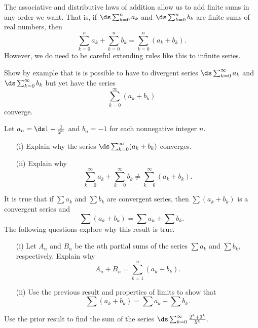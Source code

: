 \begin{exercises}
\begin{exerciseSolution}
\end{exerciseSolution}

\ea	

\item The associative and distributive laws of addition allow us to add finite sums in any order we want. That is, if $\ds \sum_{k=0}^n a_k$ and $\ds \sum_{k=0}^n b_k$ are finite sums of real numbers, then
\[\sum_{k=0}^{n} a_k + \sum_{k=0}^n b_k = \sum_{k=0}^n (a_k+b_k).\]
However, we do need to be careful extending rules like this to infinite series.
\ba
\item Show by example that is is possible to have to divergent series $\ds \sum_{k=0}^{\infty} a_k$ and $\ds \sum_{k=0}^{\infty} b_k$ but yet have the series
\[ \sum_{k=0}^{\infty} (a_k+b_k)\]
converge.

\item Let $a_n = \ds 1 + \frac{1}{2^n}$ and $b_n = -1$ for each nonnegative integer $n$.
    \begin{itemize}
    \item[(i)] Explain why the series $\ds \sum_{k=0}^{\infty} (a_k+b_k)$ converges.

    \item[(ii)] Explain why
\[\sum_{k=0}^{\infty} a_k + \sum_{k=0}^{\infty} b_k \neq \sum_{k=0}^{\infty} (a_k+b_k).\]

    \end{itemize}

\item It is true that if $\sum a_k$ and $\sum b_k$ are convergent series, then $\sum (a_k+b_k)$ is a convergent series and
\[\sum (a_k+b_k) = \sum a_k + \sum b_k.\]
The following questions explore why this result is true.
    \begin{itemize}
    \item[(i)] Let $A_n$ and $B_n$ be the $n$th partial sums of the series $\sum a_k$ and $\sum b_k$, respectively. Explain why
\[A_n + B_n = \sum_{k=1}^n (a_k+b_k).\]

    \item[(ii)] Use the previous result and properties of limits to show that
\[\sum (a_k+b_k) = \sum a_k + \sum b_k.\]

        \end{itemize}

\item Use the prior result to find the sum of the series $\ds \sum_{k=0}^{\infty} \frac{2^k+3^k}{5^k}$.

\ea


\end{exercises}
